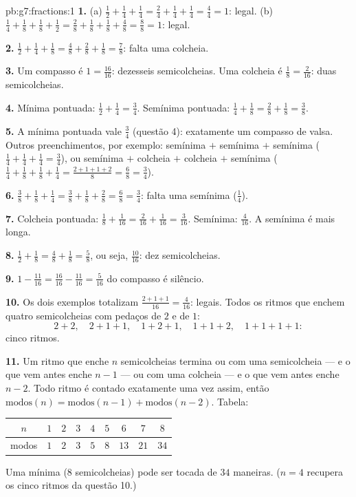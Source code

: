 \begin{solution}{pb:g7:fractions:1}
\textbf{1.} (a) $\frac12 + \frac14 + \frac14 = \frac24 + \frac14
+ \frac14 = \frac44 = 1$: legal. (b) $\frac14 + \frac18 +
\frac18 + \frac12 = \frac28 + \frac18 + \frac18 + \frac48 =
\frac88 = 1$: legal.

\textbf{2.} $\frac12 + \frac14 + \frac18 = \frac48 + \frac28 +
\frac18 = \frac78$: falta uma colcheia.

\textbf{3.} Um compasso é $1 = \frac{16}{16}$: dezesseis
semicolcheias. Uma colcheia é $\frac18 = \frac{2}{16}$: duas
semicolcheias.

\textbf{4.} Mínima pontuada: $\frac12 + \frac14 = \frac34$. Semínima
pontuada: $\frac14 + \frac18 = \frac28 + \frac18 = \frac38$.

\textbf{5.} A mínima pontuada vale $\frac34$ (questão 4): exatamente um
compasso de valsa. Outros preenchimentos, por exemplo: semínima $+$
semínima $+$ semínima ($\frac14 + \frac14 + \frac14 = \frac34$), ou
semínima $+$ colcheia $+$ colcheia $+$ semínima
($\frac14 + \frac18 + \frac18 + \frac14 =
\frac{2 + 1 + 1 + 2}{8} = \frac68 = \frac34$).

\textbf{6.} $\frac38 + \frac18 + \frac14 = \frac38 + \frac18 +
\frac28 = \frac68 = \frac34$: falta uma semínima ($\frac14$).

\textbf{7.} Colcheia pontuada: $\frac18 + \frac{1}{16} =
\frac{2}{16} + \frac{1}{16} = \frac{3}{16}$. Semínima:
$\frac{4}{16}$. A semínima é mais longa.

\textbf{8.} $\frac12 + \frac18 = \frac48 + \frac18 = \frac58$, ou seja,
$\frac{10}{16}$: dez semicolcheias.

\textbf{9.} $1 - \frac{11}{16} = \frac{16}{16} - \frac{11}{16}
= \frac{5}{16}$ do compasso é silêncio.

\textbf{10.} Os dois exemplos totalizam $\frac{2 + 1 + 1}{16} =
\frac{4}{16}$: legais. Todos os ritmos que enchem quatro semicolcheias
com pedaços de $2$ e de $1$:
\[
2{+}2, \quad 2{+}1{+}1, \quad 1{+}2{+}1, \quad 1{+}1{+}2, \quad
1{+}1{+}1{+}1 :
\]
cinco ritmos.

\textbf{11.} Um ritmo que enche $n$ semicolcheias termina ou com uma
semicolcheia --- e o que vem antes enche $n - 1$ --- ou com uma
colcheia --- e o que vem antes enche $n - 2$. Todo ritmo é contado
exatamente uma vez assim, então
$\text{modos}(n) = \text{modos}(n-1) + \text{modos}(n-2)$. Tabela:
\begin{center}
\renewcommand{\arraystretch}{1.2}
\begin{tabular}{c|cccccccc}
$n$ & $1$ & $2$ & $3$ & $4$ & $5$ & $6$ & $7$ & $8$ \\
\hline
modos & $1$ & $2$ & $3$ & $5$ & $8$ & $13$ & $21$ & $34$ \\
\end{tabular}
\end{center}
Uma mínima ($8$ semicolcheias) pode ser tocada de $34$ maneiras.
($n = 4$ recupera os cinco ritmos da questão 10.)


\end{solution}
